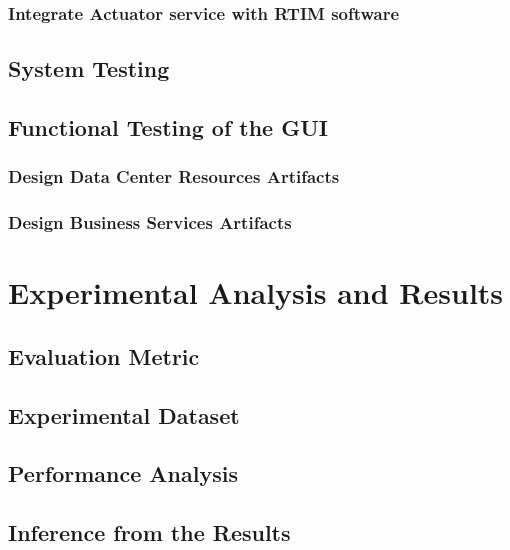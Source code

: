\documentclass[12pt]{report}
\begin{document}
\subsection{Integrate Actuator service with RTIM software}
\section{System Testing}
\section{Functional Testing of the GUI}
\subsection{Design Data Center Resources Artifacts}
\subsection{Design Business Services Artifacts}




\pagestyle{fancy}
\chead{}
\rfoot{\small{\thepage}}
\renewcommand{\headrulewidth}{0.4pt}
\renewcommand{\footrulewidth}{0.4pt}
\chapter{Experimental Analysis and Results}
\section{Evaluation Metric}
\section{Experimental Dataset}
\section{Performance Analysis}
\section{Inference from the Results}




\pagestyle{fancy}
\chead{}
\rfoot{\small{\thepage}}
\renewcommand{\headrulewidth}{0.4pt}
\renewcommand{\footrulewidth}{0.4pt}
\end{document}

